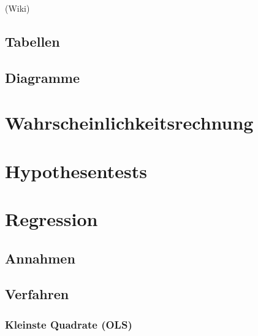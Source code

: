 \documentclass[10pt]{article}
\begin{document}
(Wiki)

\subsection{Tabellen}

\subsection{Diagramme}





\section{Wahrscheinlichkeitsrechnung}





\section{Hypothesentests}




\section{Regression}

\subsection{Annahmen}

\subsection{Verfahren}
\subsubsection{Kleinste Quadrate (OLS)}
\end{document}
